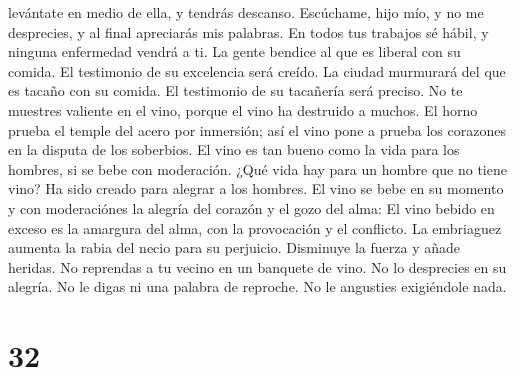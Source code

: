 levántate en medio de ella, y tendrás descanso. 
Escúchame, hijo mío, y no me desprecies, y al final apreciarás mis
palabras. En todos tus trabajos sé hábil, y ninguna enfermedad vendrá a
ti.  La gente bendice al que es liberal con su comida. El
testimonio de su excelencia será creído.  La ciudad
murmurará del que es tacaño con su comida. El testimonio de su tacañería
será preciso.  No te muestres valiente en el vino, porque
el vino ha destruido a muchos.  El horno prueba el temple
del acero por inmersión; así el vino pone a prueba los corazones en la
disputa de los soberbios.  El vino es tan bueno como la
vida para los hombres, si se bebe con moderación. ¿Qué vida hay para un
hombre que no tiene vino? Ha sido creado para alegrar a los hombres.
 El vino se bebe en su momento y con moderaciónes la
alegría del corazón y el gozo del alma:  El vino bebido
en exceso es la amargura del alma, con la provocación y el conflicto.
 La embriaguez aumenta la rabia del necio para su
perjuicio. Disminuye la fuerza y añade heridas.  No
reprendas a tu vecino en un banquete de vino. No lo desprecies en su
alegría. No le digas ni una palabra de reproche. No le angusties
exigiéndole nada.

\hypertarget{section-31}{%
\section{32}\label{section-31}}

